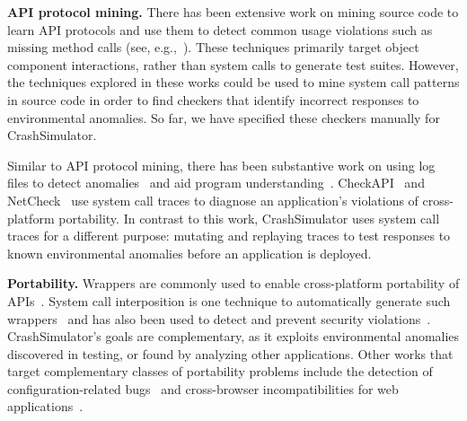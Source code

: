 \iffalse
\noindent
{\bf Specification and run-time verification.}  Substantial work has
been done in validating API and protocol behaviors, e.g., finding
faults in the Linux TCP implementation,
SSH2 and RCP~\cite{Udrea:2008}, BGP
configuration~\cite{Feamster:2005}, and identifying network
vulnerabilities~\cite{ritchey-sp00}. 
\fi

\noindent
{\bf API protocol mining.}
There has been extensive work on mining source code to learn API
protocols and use them to detect common usage violations such as
missing method calls (see, e.g.,~\cite{mariani2007compatibility,
  DBLP:journals/ase/WasylkowskiZ11, DBLP:conf/icse/PradelJAG12,
  DBLP:journals/tosem/MonperrusM13,
  DBLP:conf/icse/JamrozikSZ16}). These techniques primarily target
object component interactions, rather than system calls to generate
test suites. However, the techniques explored in these works could be
used to mine system call patterns in source code in order to find 
checkers that identify incorrect responses to environmental
anomalies. So far, we have specified these checkers manually for
CrashSimulator.

Similar to API protocol mining, there has been substantive work on
using log files to detect anomalies~\cite{pinpoint,
  jiang_abnormal_trace_detection_icac_2005, xu2009detecting,
  lou2010mining2} and aid program understanding~\cite{yuan2010sherlog,
  beschastnikh_synoptic_fse_2011, csight_icse_2014}.
CheckAPI~\cite{rasley2015detecting} and
NetCheck~\cite{Zhuang_NSDI_2014} use system call traces to diagnose an
application's violations of cross-platform portability. 
In contrast to this work, CrashSimulator uses
system call traces for a different purpose: mutating and replaying
traces to test responses to known environmental
anomalies before an application is deployed.


\noindent
{\bf Portability.}
Wrappers are commonly used to enable cross-platform portability of
APIs~\cite{bartolomeicompliance}. System call interposition is one
technique to automatically generate such wrappers~\cite{Guo:2011:CUS:2002181.2002202}
and has also been
used to detect and prevent security
violations~\cite{Hofmeyr:1998:IDU:1298081.1298084,
  Acharya:2000:MUP:1251306.1251307}.  CrashSimulator's goals are
complementary, as it exploits environmental anomalies discovered in
testing, or found by analyzing other applications.
%
Other works that target complementary classes of portability problems
include the detection of configuration-related
bugs~\cite{skoll:icse:2004, Yilmaz:issta:2004, Fouche:issta:2009,
  Kastner12, Nguyen14} and
cross-browser incompatibilities for web
applications~\cite{DBLP:conf/icsm/ChoudharyVO10, silakov2010improving,
  DBLP:conf/icse/Choudhary11, Mesbah:2011:ACC:1985793.1985870,
  DBLP:conf/icst/DallmeierP0MZ14}.


